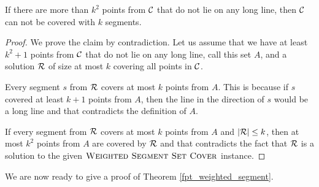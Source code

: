 \begin{claim}
\label{few_points}
If there are more than $k^2$ points from $\mathcal{C}$
that do not lie on any long line,
then $\mathcal{C}$ can not be covered with $k$ segments.
\end{claim}

\begin{proof}
We prove the claim by contradiction.
Let us assume that we have at least $k^2+1$ points
from $\mathcal{C}$ that do not lie on any long line, call this set $A$,
and a solution $\mathcal{R}$ of size at most $k$
covering all points in $\mathcal{C}$.

Every segment $s$ from $\mathcal{R}$ covers at most $k$
points from $A$.
This is because if $s$ covered at least $k+1$ points from $A$,
then the line in the direction of $s$ would be a long line
and that contradicts the definition of $A$.

If every segment from $\mathcal{R}$ covers at most $k$ points from $A$
and $|\mathcal{R}| \le k$, then at most $k^2$ points from $A$ are covered by $\mathcal{R}$
and that contradicts the fact that $\mathcal{R}$ is a solution to the given
$\textsc{Weighted Segment Set Cover}$ instance.
\end{proof}

We are now ready to give a proof of Theorem \ref{fpt_weighted_segment}.

\newcommand{\instance}{(\points,\sets)}
\newcommand{\instancePrim}{(\points',\sets')}

